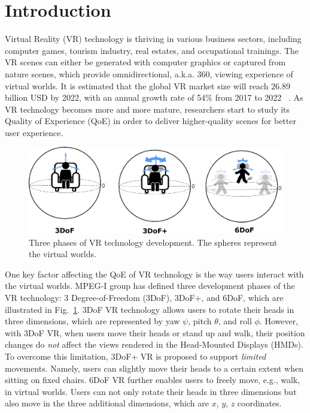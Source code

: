 \section{Introduction}\label{sec:intro}
Virtual Reality (VR) technology is thriving in various business sectors,
including computer games, tourism industry, real estates, and occupational trainings. 
The VR scenes can either be generated with computer graphics or captured from nature scenes, 
which provide omnidirectional, a.k.a. 360{\degree}, viewing experience of virtual worlds. 
It is estimated that the global VR market size will reach 26.89 billion USD by 2022, 
with an annual growth rate of 54\% from 2017 to 2022~ \cite{VR_market}.
As VR technology becomes more and more mature, 
researchers start to study its Quality of Experience (QoE) in order to deliver higher-quality scenes for better user experience.

\begin{figure}[tbh]
	\begin{center}
		\includegraphics[width=.5\textwidth]{fig/vr_phase}
		\caption{Three phases of VR technology development. The spheres represent the virtual worlds.}
		\label{fig:vr_phase}
	\end{center}
\end{figure}

One key factor affecting the QoE of VR technology is the way users interact with the virtual worlds. 
MPEG-I group has defined three development phases of the VR technology: 3 Degree-of-Freedom (3DoF), 3DoF+, and 6DoF, which are illustrated 
in Fig.~\ref{fig:vr_phase}.
3DoF VR technology allows users to rotate their heads in three dimensions, which are represented by yaw $\psi$, pitch $\theta$, and roll $\phi$. 
However, with 3DoF VR, when users move their heads or stand up and walk, their position changes do {\em not} affect the views rendered in the 
Head-Mounted Displays (HMDs).
To overcome this limitation, 3DoF+ VR is proposed to support {\em limited} movements.
Namely, users can slightly move their heads to a certain extent when sitting on fixed chairs. 
6DoF VR further enables users to freely move, e.g., walk, in virtual worlds.
Users can not only rotate their heads in three dimensions but also move in the three additional dimensions, which are $x$, $y$, $z$ coordinates. 

